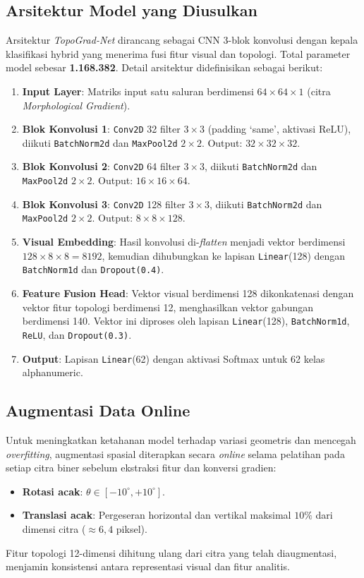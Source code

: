 \documentclass[journal]{IEEEtran}
\begin{document}
\subsection{Arsitektur Model yang Diusulkan}
Arsitektur \textit{TopoGrad-Net} dirancang sebagai CNN 3-blok konvolusi dengan kepala klasifikasi hybrid yang menerima fusi fitur visual dan topologi. Total parameter model sebesar \textbf{1.168.382}. Detail arsitektur didefinisikan sebagai berikut:
\begin{enumerate}
    \item \textbf{Input Layer}: Matriks input satu saluran berdimensi $64 \times 64 \times 1$ (citra \textit{Morphological Gradient}).
    \item \textbf{Blok Konvolusi 1}: \texttt{Conv2D} 32 filter $3 \times 3$ (padding `same', aktivasi ReLU), diikuti \texttt{BatchNorm2d} dan \texttt{MaxPool2d} $2 \times 2$. Output: $32 \times 32 \times 32$.
    \item \textbf{Blok Konvolusi 2}: \texttt{Conv2D} 64 filter $3 \times 3$, diikuti \texttt{BatchNorm2d} dan \texttt{MaxPool2d} $2 \times 2$. Output: $16 \times 16 \times 64$.
    \item \textbf{Blok Konvolusi 3}: \texttt{Conv2D} 128 filter $3 \times 3$, diikuti \texttt{BatchNorm2d} dan \texttt{MaxPool2d} $2 \times 2$. Output: $8 \times 8 \times 128$.
    \item \textbf{Visual Embedding}: Hasil konvolusi di-\textit{flatten} menjadi vektor berdimensi $128 \times 8 \times 8 = 8192$, kemudian dihubungkan ke lapisan \texttt{Linear}(128) dengan \texttt{BatchNorm1d} dan \texttt{Dropout(0.4)}.
    \item \textbf{Feature Fusion Head}: Vektor visual berdimensi 128 dikonkatenasi dengan vektor fitur topologi berdimensi 12, menghasilkan vektor gabungan berdimensi 140. Vektor ini diproses oleh lapisan \texttt{Linear}(128), \texttt{BatchNorm1d}, \texttt{ReLU}, dan \texttt{Dropout(0.3)}.
    \item \textbf{Output}: Lapisan \texttt{Linear}(62) dengan aktivasi Softmax untuk 62 kelas alphanumeric.
\end{enumerate}

\subsection{Augmentasi Data Online}
Untuk meningkatkan ketahanan model terhadap variasi geometris dan mencegah \textit{overfitting}, augmentasi spasial diterapkan secara \textit{online} selama pelatihan pada setiap citra biner sebelum ekstraksi fitur dan konversi gradien:
\begin{itemize}
    \item \textbf{Rotasi acak}: $\theta \in [-10^\circ, +10^\circ]$.
    \item \textbf{Translasi acak}: Pergeseran horizontal dan vertikal maksimal $10\%$ dari dimensi citra ($\approx 6{,}4$ piksel).
\end{itemize}
Fitur topologi 12-dimensi dihitung ulang dari citra yang telah diaugmentasi, menjamin konsistensi antara representasi visual dan fitur analitis.
\end{document}
